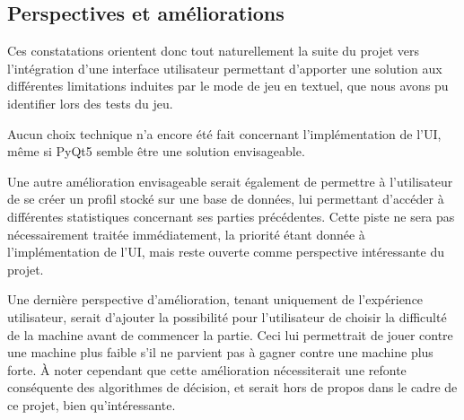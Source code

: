    \subsection{Perspectives et améliorations}\label{subsec:perspectives-et-améliorations}
      Ces constatations orientent donc tout naturellement la suite du projet vers l'intégration d'une interface utilisateur permettant d'apporter une solution aux différentes limitations induites par le mode de jeu en textuel, que nous avons pu identifier lors des tests du jeu.

      Aucun choix technique n'a encore été fait concernant l'implémentation de l'UI, même si PyQt5 semble être une solution envisageable.

      Une autre amélioration envisageable serait également de permettre à l'utilisateur de se créer un profil stocké sur une base de données, lui permettant d'accéder à différentes statistiques concernant ses parties précédentes.
      Cette piste ne sera pas nécessairement traitée immédiatement, la priorité étant donnée à l'implémentation de l'UI\@, mais reste ouverte comme perspective intéressante du projet.

      Une dernière perspective d'amélioration, tenant uniquement de l'expérience utilisateur, serait d'ajouter la possibilité pour l'utilisateur de choisir la difficulté de la machine avant de commencer la partie.
      Ceci lui permettrait de jouer contre une machine plus faible s'il ne parvient pas à gagner contre une machine plus forte.
      À noter cependant que cette amélioration nécessiterait une refonte conséquente des algorithmes de décision, et serait hors de propos dans le cadre de ce projet, bien qu'intéressante.

